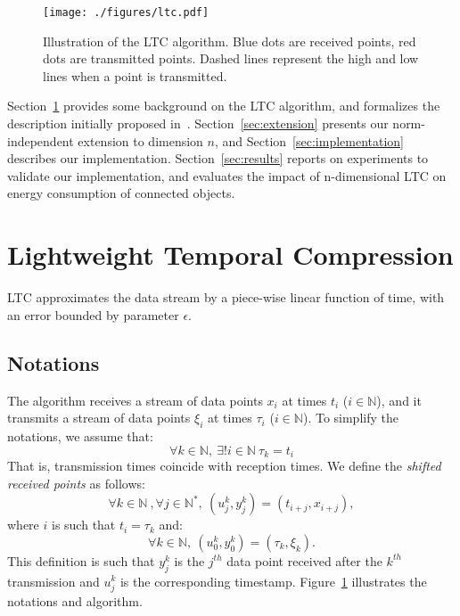 \documentclass[10pt, conference, compsocconf]{IEEEtran}
\begin{document}
\setlength{\textfloatsep}{0pt}
\begin{figure}[b]
\centering
\texttt{[image: ./figures/ltc.pdf]}
\caption{Illustration of the LTC algorithm. Blue 
dots are received points, red dots are transmitted points. Dashed lines 
represent the high and low lines when a point is 
transmitted.\vspace*{-0.3cm}}
\label{fig:ltc}
\end{figure}

Section~\ref{sec:ltc} provides some background on the LTC algorithm, 
and formalizes the description initially proposed 
in~\cite{schoellhammer2004lightweight}. Section~\ref{sec:extension} 
presents our norm-independent extension to dimension $n$, and 
Section~\ref{sec:implementation} describes our implementation. 
Section~\ref{sec:results} reports on experiments to validate our 
implementation, and evaluates the impact of n-dimensional LTC on 
energy consumption of connected objects.

\newpage

\section{Lightweight Temporal Compression}
\label{sec:ltc}

LTC approximates the data stream
by a piece-wise linear function of time, with an error bounded by parameter $\epsilon$.

\subsection{Notations}

The algorithm receives a stream of data points $x_i$
at times $t_i$ ($i \in \mathbb{N}$), and it transmits a stream of data points $\xi_i$
at times $\tau_i$ ($i \in \mathbb{N}$). To simplify the notations, we assume that:
\begin{equation*}
\forall k \in \mathbb{N}, \  \exists ! i \in \mathbb{N} \  \tau_k = t_i
\end{equation*}
That is, transmission times coincide with reception times.
We define the \emph{shifted received points} as follows:
\begin{equation*}
\forall k \in \mathbb{N}\ , \forall j \in \mathbb{N^*},\ (u^k_j, y^k_j) = (t_{i+j}, x_{i+j}), 
\end{equation*}
where $i$ is such that $t_i = \tau_k$ and:
\begin{equation*}
\forall k \in \mathbb{N},\  (u^k_0, y^k_0) = (\tau_k, \xi_k).
\end{equation*}
This definition is such that $y^k_j$ is the $j^{th}$ data point received
after the $k^{th}$ transmission and $u^k_j$ is the corresponding timestamp.
Figure~\ref{fig:ltc} illustrates the notations and algorithm.
\end{document}
